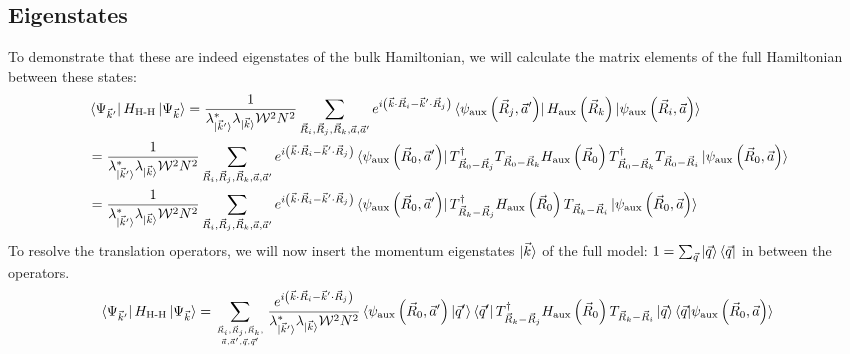 \documentclass{report}
\numberwithin{equation}{section}
\begin{document}
\begin{appendices}
\section{Eigenstates}
To demonstrate that these are indeed eigenstates of the bulk Hamiltonian, we will calculate the matrix elements of the full Hamiltonian between these states:
\begin{equation}\begin{aligned}
	&\bra{\Psi_{\vec k^\prime}}H_\text{H-H} \ket{\Psi_{\vec k}} = \frac{1}{\lambda^*_{\ket{\vec k^\prime}} \lambda_{\ket{\vec k}} \mathcal{W}^2 N^2}\sum_{\vec R_i, \vec R_j, \vec R_k, \vec a, \vec a^\prime}e^{i\left(\vec{k}\cdot\vec{R}_i - \vec{k}^\prime\cdot\vec{R}_j\right)} \bra{\psi_\text{aux}\left(\vec R_j, \vec a^\prime\right)} H_\text{aux}\left(\vec R_k\right) \ket{\psi_\text{aux}\left(\vec R_i, \vec a\right)}\\
	&= \frac{1}{\lambda^*_{\ket{\vec k^\prime}} \lambda_{\ket{\vec k}} \mathcal{W}^2 N^2}\sum_{\vec R_i, \vec R_j, \vec R_k, \vec a, \vec a^\prime}e^{i\left(\vec{k}\cdot\vec{R}_i - \vec{k}^\prime\cdot\vec{R}_j\right)} \bra{\psi_\text{aux}\left(\vec R_0, \vec a^\prime\right)} T^\dagger_{\vec R_0 - \vec R_j} T_{\vec R_0 - \vec R_k} H_\text{aux}\left(\vec R_0\right) T^\dagger_{\vec R_0 - \vec R_k} T_{\vec R_0 - \vec R_i} \ket{\psi_\text{aux}\left(\vec R_0, \vec a\right)}\\
	&= \frac{1}{\lambda^*_{\ket{\vec k^\prime}} \lambda_{\ket{\vec k}} \mathcal{W}^2 N^2}\sum_{\vec R_i, \vec R_j, \vec R_k, \vec a, \vec a^\prime}e^{i\left(\vec{k}\cdot\vec{R}_i - \vec{k}^\prime\cdot\vec{R}_j\right)} \bra{\psi_\text{aux}\left(\vec R_0, \vec a^\prime\right)} T^\dagger_{\vec R_k - \vec R_j} H_\text{aux}\left(\vec R_0\right) T_{\vec R_k - \vec R_i} \ket{\psi_\text{aux}\left(\vec R_0, \vec a\right)}
\end{aligned}\end{equation}
To resolve the translation operators, we will now insert the momentum eigenstates \(\ket{\vec k}\) of the full model: \(1 = \sum_{\vec q}\ket{\vec q}\bra{\vec q}\) in between the operators.
\begin{equation}\begin{aligned}
	\bra{\Psi_{\vec k^\prime}}H_\text{H-H} \ket{\Psi_{\vec k}} &= \sum_{\vec R_i, \vec R_j, \vec R_k, \atop{\vec a, \vec a^\prime, \vec q, \vec q^\prime}}\frac{e^{i\left(\vec{k}\cdot\vec{R}_i - \vec{k}^\prime\cdot\vec{R}_j\right)}}{\lambda^*_{\ket{\vec k^\prime}} \lambda_{\ket{\vec k}} \mathcal{W}^2 N^2} \braket{\psi_\text{aux}\left(\vec R_0, \vec a^\prime\right)| \vec q^\prime}\bra{\vec q^\prime} T^\dagger_{\vec R_k - \vec R_j} H_\text{aux}\left(\vec R_0\right) T_{\vec R_k - \vec R_i}  \ket{\vec q}\braket{\vec q | \psi_\text{aux}\left(\vec R_0, \vec a\right)}\\

\end{aligned}
\end{equation}
\end{appendices}
\end{document}
